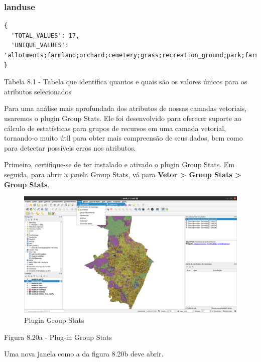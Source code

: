 \documentclass[
]{krantz}
\begin{document}
\hypertarget{landuse}{%
\subsubsection{landuse}\label{landuse}}

\begin{verbatim}
{
  'TOTAL_VALUES': 17,
  'UNIQUE_VALUES': 'allotments;farmland;orchard;cemetery;grass;recreation_ground;park;farmyard;industrial;meadow;heath;commercial;forest;scrub;retail;military;residential'
}
\end{verbatim}

Tabela 8.1 - Tabela que identifica quantos e quais são os valores únicos para os atributos selecionados

Para uma análise mais aprofundada dos atributos de nossas camadas vetoriais, usaremos o plugin Group Stats. Ele foi desenvolvido para oferecer suporte ao cálculo de estatísticas para grupos de recursos em uma camada vetorial, tornando-o muito útil para obter mais compreensão de seus dados, bem como para detectar possíveis erros nos atributos.

Primeiro, certifique-se de ter instalado e ativado o plugin Group Stats. Em seguida, para abrir a janela Group Stats, vá para \textbf{Vetor \textgreater{} Group Stats \textgreater{} Group Stats}.

\begin{figure}
\centering
\includegraphics{media/modulo8/fig820_a.png}
\caption{Plugin Group Stats}
\end{figure}

Figura 8.20a - Plug-in Group Stats

Uma nova janela como a da figura 8.20b deve abrir.
\end{document}
